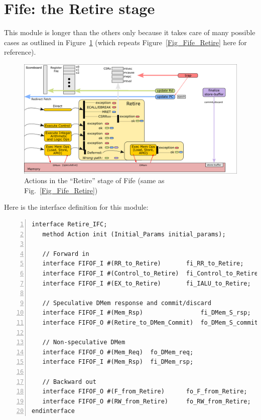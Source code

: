 \section{Fife: the Retire stage}

\label{Sec_Fife_Retire_code}

This module is longer than the others only because it takes care of
many possible cases as outlined in Figure~\ref{Fig_Fife_Retire_2}
(which repeats Figure~\ref{Fig_Fife_Retire} here for reference).
\begin{figure}[htbp]
  \centerline{\includegraphics[width=6in,angle=0]{Figures/Fig_Retire_Layers_1_2}}
  \caption{\label{Fig_Fife_Retire_2}
           Actions in the ``Retire'' stage of Fife
	   (same as Fig.~\ref{Fig_Fife_Retire})}
\end{figure}

Here is the interface definition for this module:

{\small
\begin{Verbatim}[frame=single, numbers=left, label=(In file:src\_Fife/S5\_Retire.bsv)]
interface Retire_IFC;
   method Action init (Initial_Params initial_params);

   // Forward in
   interface FIFOF_I #(RR_to_Retire)       fi_RR_to_Retire;
   interface FIFOF_I #(Control_to_Retire)  fi_Control_to_Retire;
   interface FIFOF_I #(EX_to_Retire)       fi_IALU_to_Retire;

   // Speculative DMem response and commit/discard
   interface FIFOF_I #(Mem_Rsp)                fi_DMem_S_rsp;
   interface FIFOF_O #(Retire_to_DMem_Commit)  fo_DMem_S_commit;

   // Non-speculative DMem
   interface FIFOF_O #(Mem_Req)  fo_DMem_req;
   interface FIFOF_I #(Mem_Rsp)  fi_DMem_rsp;

   // Backward out
   interface FIFOF_O #(F_from_Retire)      fo_F_from_Retire;
   interface FIFOF_O #(RW_from_Retire)     fo_RW_from_Retire;
endinterface
\end{Verbatim}
}

